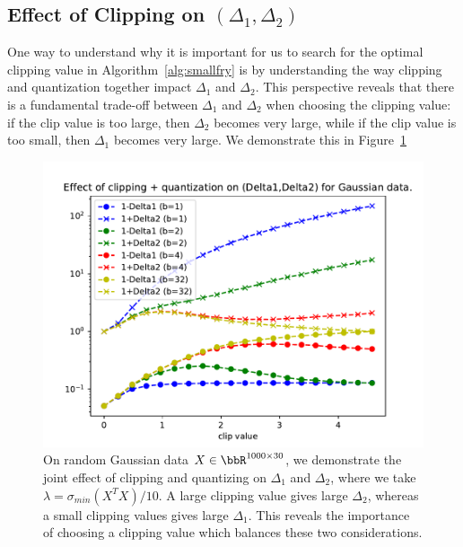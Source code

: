 \subsection{Effect of Clipping on $(\Delta_1,\Delta_2)$}
One way to understand why it is important for us to search for the optimal clipping value in Algorithm~\ref{alg:smallfry} is by understanding the way clipping and quantization together impact $\Delta_1$ and $\Delta_2$.
This perspective reveals that there is a fundamental trade-off between $\Delta_1$ and $\Delta_2$ when choosing the clipping value:
if the clip value is too large, then $\Delta_2$ becomes very large, while if the clip value is too small, then $\Delta_1$ becomes very large.
We demonstrate this in Figure~\ref{fig:deltas_vs_clip_quant}
\begin{figure}
	\begin{center}
		\centerline{\includegraphics[width=0.8\columnwidth]{figures/deltas_vs_clip_and_quant.pdf}}
		\caption{On random Gaussian data $X \in \RR^{1000\times 30}$, we demonstrate the joint effect of clipping and quantizing on $\Delta_1$ and $\Delta_2$, where we take $\lambda = \sigma_{min}(X^T X)/10$.
		A large clipping value gives large $\Delta_2$, whereas a small clipping values gives large $\Delta_1$.
		This reveals the importance of choosing a clipping value which balances these two considerations.
		}
		\label{fig:deltas_vs_clip_quant}
	\end{center}
\end{figure}
